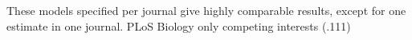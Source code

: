 
These models specified per journal give highly comparable results, except for one estimate in one journal. PLoS Biology only competing interests (.111)